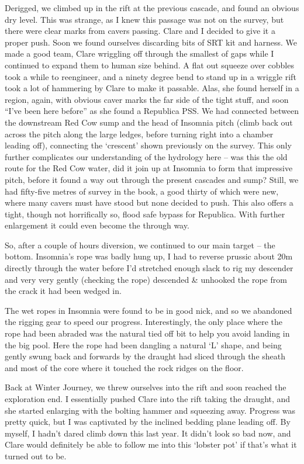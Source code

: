 Derigged, we climbed up in the rift at the previous cascade, and found
an obvious dry level. This was strange, as I knew this passage was not
on the survey, but there were clear marks from cavers passing. Clare and
I decided to give it a proper push. Soon we found ourselves discarding
bits of SRT kit and harness. We made a good team, Clare wriggling off
through the smallest of gaps while I continued to expand them to human
size behind. A flat out squeeze over cobbles took a while to reengineer,
and a ninety degree bend to stand up in a wriggle rift took a lot of
hammering by Clare to make it passable. Alas, she found herself in a
region, again, with obvious caver marks the far side of the tight stuff,
and soon ``I've been here before'' as she found a Republica PSS. We had
connected between the downstream Red Cow sump and the head of Insomnia
pitch (climb back out across the pitch along the large ledges, before
turning right into a chamber leading off), connecting the `crescent'
shown previously on the survey. This only further complicates our
understanding of the hydrology here -- was this the old route for the
Red Cow water, did it join up at Insomnia to form that impressive pitch,
before it found a way out through the present cascades and sump? Still,
we had fifty-five metres of survey in the book, a good thirty of which
were new, where many cavers must have stood but none decided to push.
This also offers a tight, though not horrifically so, flood safe bypass
for Republica. With further enlargement it could even become the through
way.

So, after a couple of hours diversion, we continued to our main target
-- the bottom. Insomnia's rope was badly hung up, I had to reverse
prussic about 20m directly through the water before I'd stretched enough
slack to rig my descender and very very gently (checking the rope)
descended \& unhooked the rope from the crack it had been wedged in.

The wet ropes in Insomnia were found to be in good nick, and so we
abandoned the rigging gear to speed our progress. Interestingly, the
only place where the rope had been abraded was the natural tied off bit
to help you avoid landing in the big pool. Here the rope had been
dangling a natural `L' shape, and being gently swung back and forwards
by the draught had sliced through the sheath and most of the core where
it touched the rock ridges on the floor.

Back at Winter Journey, we threw ourselves into the rift and soon
reached the exploration end. I essentially pushed Clare into the rift
taking the draught, and she started enlarging with the bolting hammer
and squeezing away. Progress was pretty quick, but I was captivated by
the inclined bedding plane leading off. By myself, I hadn't dared climb
down this last year. It didn't look so bad now, and Clare would
definitely be able to follow me into this `lobster pot' if that's what
it turned out to be.

